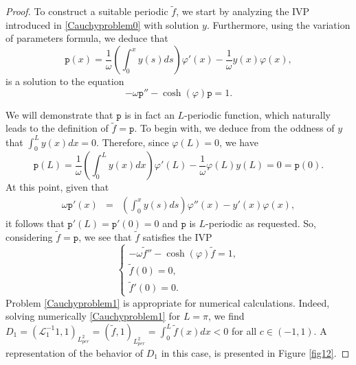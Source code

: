 \documentclass[12pt,reqno,a4paper]{amsart} %
\numberwithin{equation}{section}
\numberwithin{figure}{section}
\begin{document}
\begin{proof}
 			To construct a suitable periodic $\tilde{f}$, we start by analyzing the IVP introduced  in \eqref{Cauchyproblem0} with solution $y$. Furthermore, using the variation of parameters formula, we deduce that
 			$$
 			\mathtt{p}(x)=\frac{1}{\omega}\left(\int_0^xy(s)ds\right)\varphi'(x)-\frac{1}{\omega}y(x)\varphi(x),
 			$$ 
 			is a solution to the equation
 			$$
 			-\omega 	\mathtt{p}''-\cosh(\varphi)	\mathtt{p}=1.
 			$$
 			
 			We will demonstrate that $	\mathtt{p}$ is in fact an $L$-periodic function, which naturally leads to the definition of $\tilde{f}=	\mathtt{p}$. To begin with, we deduce from the oddness of 
 			$y$ that $\displaystyle\int_0^Ly(x)dx=0$. Therefore, since $\varphi(L)=0$, we have $$ 	\mathtt{p}(L)=\frac{1}{\omega}\left(\int_0^Ly(x)dx\right)\varphi'(L)-\frac{1}{\omega}\varphi(L)y(L)=0=	\mathtt{p}(0).$$ At this point, given that 
 			$$\begin{array}{lllll}\displaystyle \omega 	\mathtt{p}'(x)
 				&=&\displaystyle\left(\int_0^xy(s)ds\right)\varphi''(x)-y'(x)\varphi(x),\end{array}$$
 			it follows that $	\mathtt{p}'(L)=	\mathtt{p}'(0)=0$ and $	\mathtt{p}$ is $L$-periodic as requested. So, considering $\tilde{f}=	\mathtt{p}$, we see that  $\tilde{f}$ satisfies the IVP
 			\begin{equation}\label{Cauchyproblem1} 
 				\begin{cases}
 					-\omega\tilde{f}''-\cosh(\varphi) \tilde{f}=1, \\
 					\tilde{f}(0)= 0, \\
 					\tilde{f}'(0)=0.
 				\end{cases}
 			\end{equation}
 			Problem \eqref{Cauchyproblem1} is appropriate for numerical calculations. Indeed, solving numerically  \eqref{Cauchyproblem1} for $L=\pi$, we find   $\displaystyle D_1=(\mathcal{L}_1^{-1}1,1)_{L^2_{per}}=(\tilde{f},1)_{L^2_{per}}=\int_{0}^{L}\tilde{f}(x)dx<0$ for all  $c\in (-1,1)$. A representation of the behavior of $D_1$ in this case, is presented in Figure \ref{fig12}.
 			

\end{proof}
\end{document}
